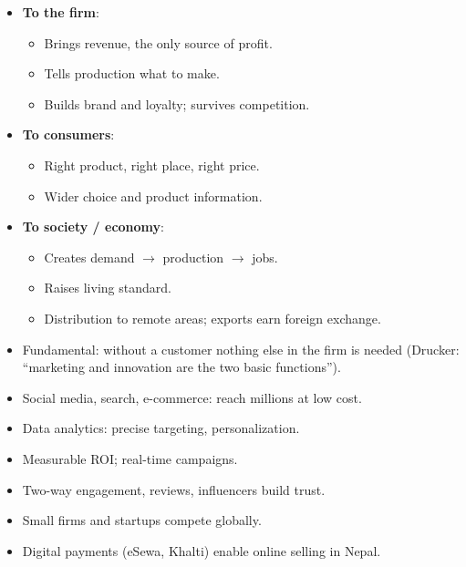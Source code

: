 {\begin{itemize}
\end{itemize}}{%
\begin{itemize}
  \item \textbf{To the firm}:
  \begin{itemize}
    \item Brings revenue, the only source of profit.
    \item Tells production what to make.
    \item Builds brand and loyalty; survives competition.
  \end{itemize}
  \item \textbf{To consumers}:
  \begin{itemize}
    \item Right product, right place, right price.
    \item Wider choice and product information.
  \end{itemize}
  \item \textbf{To society / economy}:
  \begin{itemize}
    \item Creates demand $\rightarrow$ production $\rightarrow$ jobs.
    \item Raises living standard.
    \item Distribution to remote areas; exports earn foreign exchange.
  \end{itemize}
  \item Fundamental: without a customer nothing else in the firm is needed (Drucker:
    ``marketing and innovation are the two basic functions'').
\end{itemize}
\begin{itemize}
  \item Social media, search, e-commerce: reach millions at low cost.
  \item Data analytics: precise targeting, personalization.
  \item Measurable ROI; real-time campaigns.
  \item Two-way engagement, reviews, influencers build trust.
  \item Small firms and startups compete globally.
  \item Digital payments (eSewa, Khalti) enable online selling in Nepal.
\end{itemize}}

